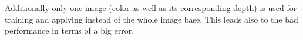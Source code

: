 Additionally only one image (color as well as its corresponding depth) is used for training and applying instead of the whole image base. This leads also to the bad performance in terms of a big error. 


\clearpage
\renewcommand{\leftmark}{}




%





